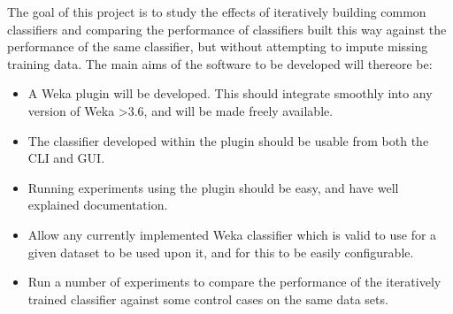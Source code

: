 
The goal of this project is to study the effects of iteratively building common classifiers and comparing the performance of classifiers built this way against the performance of the same classifier, but without attempting to impute missing training data. The main aims of the software to be developed will thereore be:

\begin{itemize}
\item A Weka plugin will be developed. This should integrate smoothly into any version of Weka \textgreater 3.6, and will be made freely available. 
\item The classifier developed within the plugin should be usable from both the CLI and GUI.
\item Running experiments using the plugin should be easy, and have well explained documentation.
\item Allow any currently implemented Weka classifier which is valid to use for a given dataset to be used upon it, and for this to be easily configurable.
\item Run a number of experiments to compare the performance of the iteratively trained classifier against some control cases on the same data sets.
\end{itemize}
